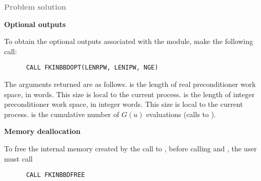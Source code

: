 \begin{Steps}
\item \textcolor{gray}{\bf Problem solution}
  
\item {\bf {\kinbbdpre} Optional outputs}
  
  To obtain the optional outputs associated with the {\kinbbdpre} module, make
  the following call:
\begin{verbatim}
      CALL FKINBBDOPT(LENRPW, LENIPW, NGE)
\end{verbatim}
  The arguments returned are as follows.
   is the length of real preconditioner work space, in 
  words.  This size is local to the current process.
   is the length of integer preconditioner work space, in integer
  words.  This size is local to the current process.
   is the cumulative number of $G(u)$ evaluations (calls to ).
  
\item {\bf Memory deallocation}

  To free the internal memory created by the call to , before
  calling  and , the user must call
\begin{verbatim}
      CALL FKINBBDFREE
\end{verbatim}

\end{Steps}
